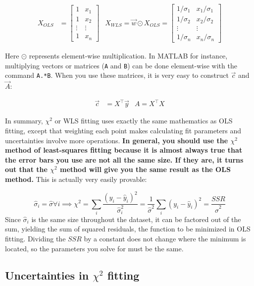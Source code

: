 \begin{align}
X_{OLS} &= \begin{bmatrix}
  1 & x_1 \\
  1 & x_2 \\ 
  \vdots & \vdots \\
 1 & x_n
 \end{bmatrix}
 &X_{WLS} = \vec w \odot X_{OLS} = \begin{bmatrix}
1/\sigma_1 & x_1/\sigma_1 \\
  1/\sigma_2 & x_2/\sigma_2 \\ 
  \vdots & \vdots \\
 1/\sigma_n & x_n/\sigma_n
 \end{bmatrix}
\end{align}

Here $\odot$ represents element-wise multiplication. In MATLAB for instance, multiplying vectors or matrices (\texttt{A} and \texttt{B}) can be done element-wise with the command \texttt{A.*B}. When you use these matrices, it is very easy to construct $\vec c$ and $\vec A$:

\begin{align}
\vec c &= X^\intercal \vec y &A =  X^\intercal X
\end{align}


In summary, $\chi^2$ or WLS fitting uses exactly the same mathematics as OLS fitting, except that weighting each point makes calculating fit parameters and uncertainties involve more operations. { \bf In general, you should use the  $\chi^2$ method of least-squares fitting because it is almost always true that the error bars you use are not all the same size. If they are, it turns out that the $\chi^2$ method will give you the same result as the OLS method.} This is actually very easily provable:

\begin{equation}
\hat \sigma_i = \hat \sigma \forall i \implies \chi^2 = \sum_i  \frac{(y_i - \hat y_i)^2}{\hat \sigma_i^2} = \frac{1}{\hat \sigma^2} \sum_i (y_i - \hat y_i)^2 = \frac{SSR}{\hat \sigma^2} 
\end{equation}
Since $\hat \sigma_i$ is the same size throughout the dataset, it can be factored out of the sum, yielding the sum of squared residuals, the function to be minimized in OLS fitting. Dividing the $SSR$ by a constant does not change where the minimum is located, so the parameters you solve for must be the same.

\subsection{Uncertainties in $\chi^2$ fitting}

